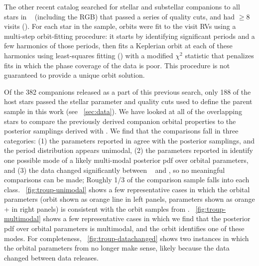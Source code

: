 \documentclass[modern, letterpaper]{aastex62}
\newcommand{\apogee}{\project{\acronym{APOGEE}}}
\newcommand{\thejoker}{\project{The~Joker}}
\newcommand{\DR}{\acronym{DR14}}
\begin{document}
The other recent catalog searched for stellar and substellar companions to all
stars in \apogee\  (including the RGB) that passed a series of
quality cuts, and had $\geq 8$ visits (\citealt{Troup:2016}).
For each star in the sample, orbits were fit to the visit RVs using a multi-step
orbit-fitting procedure: it starts by identifying significant periods and a few
harmonics of those periods, then fits a Keplerian orbit at each of these
harmonics using least-squares fitting (\citealt{De-Lee:2013}) with a modified
$\chi^2$ statistic that penalizes fits in which the phase coverage of the data
is poor.
This procedure is not guaranteed to provide a unique orbit solution.

Of the 382 companions released as a part of this previous search, only 188 of
the host stars passed the stellar parameter and quality cuts used to define the
parent sample in this work (see \sectionname~\ref{sec:data}).
We have looked at all of the overlapping stars to compare the previously derived
companion orbital properties to the posterior samplings derived with \thejoker.
We find that the comparisons fall in three categories:
(1) the parameters reported in \citet{Troup:2016} agree with the posterior
samplings, and the period distribution appears unimodal,
(2) the parameters reported in \citet{Troup:2016} identify one possible mode of
a likely multi-modal posterior pdf over orbital parameters, and
(3) the data changed significantly between \apogee\  and \DR, so
no meaningful comparisons can be made; Roughly 1/3 of the comparison sample
falls into each class.
\figurename~\ref{fig:troup-unimodal} shows a few representative cases in which
the \citet{Troup:2016} orbital parameters (orbit shown as orange line in left
panels, parameters shown as orange + in right panels) is consistent with the
orbit samples from \thejoker.
\figurename~\ref{fig:troup-multimodal} shows a few representative cases in which
we find that the posterior pdf over orbital parameters is multimodal, and the
\citet{Troup:2016} orbit identifies one of these modes.
For completeness, \figurename~\ref{fig:troup-datachanged} shows two instances in
which the orbital parameters from \citet{Troup:2016} no longer make sense,
likely because the data changed between data releases.
\end{document}
